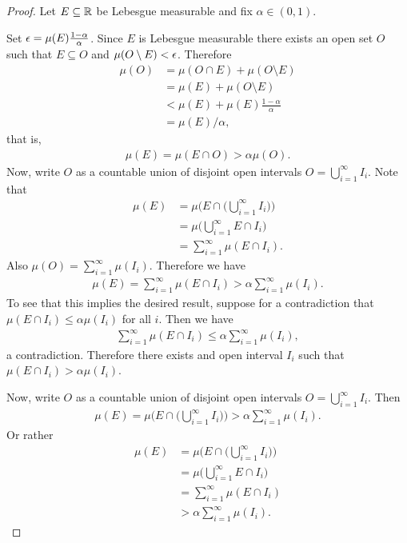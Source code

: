 \begin{proof}
  Let $E \subseteq \mathbb{R}$ be Lebesgue measurable and fix $\alpha \in (0, 1)$.

  Set $\epsilon = \mu(E)\frac{1 - \alpha}{\alpha}$. Since $E$ is Lebesgue measurable there exists an open set $O$
  such that $E \subseteq O$ and $\mu(O \setminus E) < \epsilon$. Therefore
  \begin{align*}
    \mu(O)
    &= \mu(O \cap E) + \mu(O \setminus E) \\
    &= \mu(E) + \mu(O \setminus E) \\
    &< \mu(E) + \mu(E)\frac{1 - \alpha}{\alpha} \\
    &= \mu(E)/\alpha,
  \end{align*}
  that is,
  \begin{align*}
    \mu(E) = \mu(E \cap O) > \alpha\mu(O).
  \end{align*}
  Now, write $O$ as a countable union of disjoint open intervals $O = \bigcup_{i=1}^\infty I_i$. Note that
    \begin{align*}
    \mu(E)
    &= \mu\Big(E \cap \big(\bigcup_{i=1}^\infty I_i\big)\Big) \\
    &= \mu\Big(\bigcup_{i=1}^\infty E \cap I_i\Big) \\
    &= \sum_{i=1}^\infty \mu(E \cap I_i).
  \end{align*}
  Also $\mu(O) = \sum_{i=1}^\infty \mu(I_i)$. Therefore we have
  \begin{align*}
    \mu(E) = \sum_{i=1}^\infty \mu(E \cap I_i) > \alpha \sum_{i=1}^\infty \mu(I_i).
  \end{align*}
  To see that this implies the desired result, suppose for a contradiction
  that $\mu(E \cap I_i) \leq \alpha \mu(I_i)$ for all $i$. Then we have
  \begin{align*}
    \sum_{i=1}^\infty \mu(E \cap I_i) \leq \alpha \sum_{i=1}^\infty \mu(I_i),
  \end{align*}
  a contradiction. Therefore there exists and open interval $I_i$ such that
  $\mu(E \cap I_i) > \alpha \mu(I_i)$.

  Now, write $O$ as a countable union of disjoint open intervals $O = \bigcup_{i=1}^\infty I_i$. Then
  \begin{align*}
    \mu(E) = \mu\Big(E \cap \big(\bigcup_{i=1}^\infty I_i\big)\Big) > \alpha\sum_{i=1}^\infty \mu(I_i).
  \end{align*}
  Or rather
  \begin{align*}
    \mu(E)
    &= \mu\Big(E \cap \big(\bigcup_{i=1}^\infty I_i\big)\Big) \\
    &= \mu\Big(\bigcup_{i=1}^\infty E \cap I_i\Big) \\
    &= \sum_{i=1}^\infty \mu(E \cap I_i) \\
    &> \alpha \sum_{i=1}^\infty \mu(I_i).
  \end{align*}





\end{proof}
